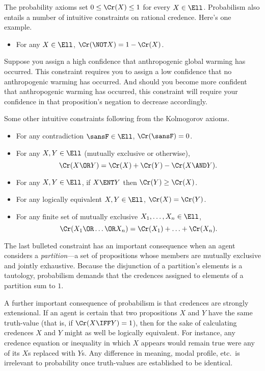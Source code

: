 The probability axioms set $0 \le \Cr(X) \le 1$ for every $X \in \Ell$. Probabilism also entails a number of intuitive constraints on rational credence. Here's one example.
\begin{itemize}
\item{For any $X \in \Ell$, $\Cr(\NOT X)=1-\Cr(X)$.}
\end{itemize}
Suppose you assign a high confidence that anthropogenic global warming has occurred. This constraint requires you to assign a low confidence that no anthropogenic warming has occurred. And should you become more confident that anthropogenic warming has occurred, this constraint will require your confidence in that proposition's negation to decrease accordingly.

Some other intuitive constraints following from the Kolmogorov axioms.
\begin{itemize}
\item For any contradiction $\sansF \in \Ell$, $\Cr(\sansF)=0$.
\item For any $X, Y \in \Ell$ (mutually exclusive or otherwise), $$\Cr(X \OR Y)=\Cr(X) + \Cr(Y) - \Cr(X \AND Y).$$
\item For any $X, Y \in \Ell$, if $X \ENT Y$ then $\Cr(Y) \ge \Cr(X)$.
\item For any logically equivalent $X, Y \in \Ell$, $\Cr(X)=\Cr(Y)$.
\item For any finite set of mutually exclusive $X_1, \ldots, X_n \in \Ell$, $$\Cr(X_1 \OR \ldots \OR X_n)=\Cr(X_1)+\ldots+\Cr(X_n).$$
\end{itemize}
The last bulleted constraint has an important consequence when an agent considers a \textit{partition}---a set of propositions whose members are mutually exclusive and jointly exhaustive. Because the disjunction of a partition's elements is a tautology, probabilism demands that the credences assigned to elements of a partition sum to $1$.
 
A further important consequence of probabilism is that credences are strongly extensional. If an agent is certain that two propositions $X$ and $Y$ have the same truth-value (that is, if $\Cr(X \IFF Y)=1$), then for the sake of calculating credences $X$ and $Y$ might as well be logically equivalent. For instance, any credence equation or inequality in which $X$ appears would remain true were any of its $X$s replaced with $Y$s. Any difference in meaning, modal profile, etc.\ is irrelevant to probability once truth-values are established to be identical.

